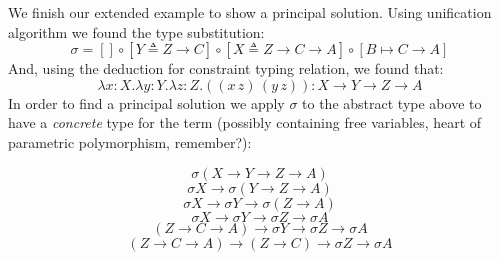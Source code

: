 \documentclass[8pt]{beamer}
\begin{document}
\begin{frame}
    We finish our extended example to show a principal solution. Using
    unification algorithm we found the type substitution:
    \begin{displaymath}
         \sigma = []\circ[ Y \triangleq  Z \rightarrow
                C]\circ[ X \triangleq  Z \rightarrow C\rightarrow
            A]\circ[B\mapsto C\rightarrow A]
    \end{displaymath}
    And, using the deduction for constraint typing relation, we found
    that:
    \begin{displaymath}
        \lambda x:X. \lambda y:Y.
            \lambda z:Z.  ((x\, z)\, (y \, z)):X \rightarrow
                Y \rightarrow Z\rightarrow A
    \end{displaymath}
    In order to find a principal solution we apply $\sigma$ to the
    abstract type above to have a \emph{concrete} type for the term
    (possibly containing free variables, heart of parametric polymorphism,
    remember?):
    \begin{overprint}
        \begin{displaymath}
            \sigma (X \rightarrow Y \rightarrow Z\rightarrow A)
        \end{displaymath}
        \begin{displaymath}
            \sigma X \rightarrow \sigma(Y \rightarrow Z\rightarrow A)
        \end{displaymath}
        \begin{displaymath}
            \sigma X \rightarrow \sigma Y \rightarrow \sigma (Z\rightarrow A)
        \end{displaymath}
        \begin{displaymath}
            \sigma X \rightarrow \sigma Y \rightarrow \sigma
            Z\rightarrow \sigma A
        \end{displaymath}
        \begin{displaymath}
            (Z\rightarrow C\rightarrow A) \rightarrow \sigma Y 
            \rightarrow \sigma Z\rightarrow \sigma A
        \end{displaymath}
        \begin{displaymath}
            (Z\rightarrow C\rightarrow A) \rightarrow (Z\rightarrow C) 
            \rightarrow \sigma Z\rightarrow \sigma A
        \end{displaymath}

\end{overprint}
\end{frame}
\end{document}
